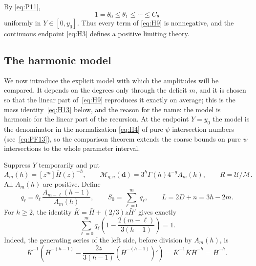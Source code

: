 By \eqref{eq:P11}, \begin{equation}
1=\theta_0\le\theta_1\le\cdots\le C_\theta
\label{eq:H11}
\end{equation} uniformly in \(Y\in[0,y_0]\). Thus every term of \eqref{eq:H9} is nonnegative,
and the continuous endpoint \eqref{eq:H3} defines a positive limiting theory.

\subsection{The harmonic model}\label{harmonic-model-and-the-needed-uniform-coefficient-estimates}

We now introduce the explicit model with which the amplitudes will be
compared. It depends on the degrees only through the deficit \(m\), and it
is chosen so that the linear part of~\eqref{eq:H9} reproduces it exactly
on average; this is the mass identity~\eqref{eq:H13} below, and the
reason for the name: the model is harmonic for the linear part of the
recursion. At the
endpoint \(Y=y_0\) the model is the denominator in the normalization
\eqref{eq:H4} of pure \(\psi\) intersection numbers (see~\eqref{eq:PF13}),
so the comparison theorem extends the coarse bounds on pure \(\psi\)
intersections to the whole parameter interval.

Suppress \(Y\) temporarily and put \begin{equation}
A_m(h)=[z^m]\bar H(z)^{-h},\qquad
\mathcal M_{g,n}(\mathbf d)=3^h\Gamma(h)4^{-g}A_m(h),\qquad
R=\mathcal U/\mathcal M.
\label{eq:H12}
\end{equation} All \(A_m(h)\) are positive. Define \[
q_\ell=\theta_\ell\,\frac{A_{m-\ell}(h-1)}{A_m(h)},
\qquad S_0=\sum_{\ell=0}^m q_\ell,\qquad
L=2D+n=3h-2m.
\] For \(h\ge2\), the identity \(\bar K=\bar H+(2/3)z\bar H'\) gives exactly \begin{equation}
\sum_{\ell=0}^m q_\ell
\left(1-\frac{2(m-\ell)}{3(h-1)}\right)=1.
\label{eq:H13}
\end{equation} Indeed, the generating series of the left side, before division by
\(A_m(h)\), is \[
\bar K^{-1}\left(\bar H^{-(h-1)}
-\frac{2z}{3(h-1)}(\bar H^{-(h-1)})'\right)
=\bar K^{-1}\bar K\bar H^{-h}=\bar H^{-h}.
\]


